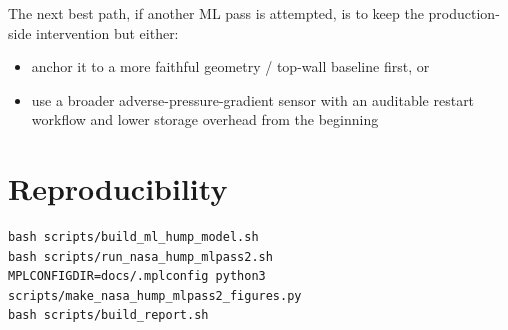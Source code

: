 \documentclass[11pt]{article}
\begin{document}
The next best path, if another ML pass is attempted, is to keep the
production-side intervention but either:
\begin{itemize}[leftmargin=1.2em]
\item anchor it to a more faithful geometry / top-wall baseline first, or
\item use a broader adverse-pressure-gradient sensor with an auditable restart
workflow and lower storage overhead from the beginning
\end{itemize}

\section*{Reproducibility}
\begin{Verbatim}[fontsize=\small]
bash scripts/build_ml_hump_model.sh
bash scripts/run_nasa_hump_mlpass2.sh
MPLCONFIGDIR=docs/.mplconfig python3 scripts/make_nasa_hump_mlpass2_figures.py
bash scripts/build_report.sh
\end{Verbatim}
\end{document}

